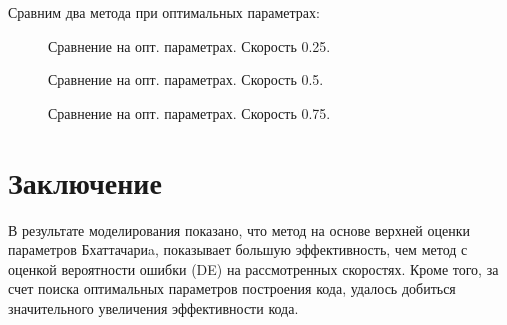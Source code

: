 \documentclass{llncs}
\begin{document}
\newpage
Сравним два метода при оптимальных параметрах:
\begin{figure}[!h]
\caption{Сравнение на опт. параметрах. Скорость 0.25.}
\label{ris:image}
\end{figure}
\begin{figure}[!h]
\caption{Сравнение на опт. параметрах. Скорость 0.5.}
\label{ris:image}
\end{figure}
\begin{figure}[!h]
\caption{Сравнение на опт. параметрах. Скорость 0.75.}
\label{ris:image}
\end{figure}
\newpage


\section{Заключение}

В результате моделирования показано, что метод на основе верхней оценки параметров Бхаттачариa, показывает большую эффективность, чем метод с оценкой вероятности ошибки (DE) на рассмотренных скоростях. Кроме того, за счет поиска оптимальных параметров построения кода, удалось добиться значительного увеличения эффективности кода. 
\end{document}
